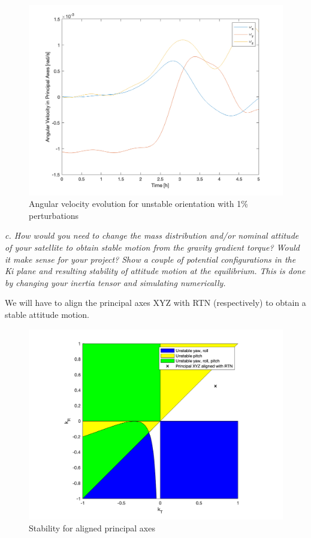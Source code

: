 \begin{figure}[H]
\centering
\includegraphics[scale=0.6]{Images/ps5_problem1b_angvel.png}
\caption{Angular velocity evolution for unstable orientation with 1\% perturbations}
\label{fig:ps5_problem1b_angvel}
\end{figure}


\textit{c. How would you need to change the mass distribution and/or nominal attitude of your satellite to obtain stable motion from the gravity gradient torque? Would it make sense for your project? Show a couple of potential configurations in the Ki plane and resulting stability of attitude motion at the equilibrium. This is done by changing your inertia tensor and simulating numerically.}

We will have to align the principal axes XYZ with RTN (respectively) to obtain a stable attitude motion.

\begin{figure}[H]
\centering
\includegraphics[scale=0.6]{Images/ps5_problem1c.png}
\caption{Stability for aligned principal axes}
\label{fig:ps5_problem1c}
\end{figure}

